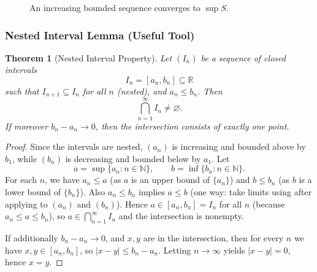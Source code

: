 \documentclass[12pt]{article}
\numberwithin{equation}{section}
\def\abs#1{|#1|}
\def\eps{epsilon}
\newcommand{\RR}{\mathbb{R}}
\newcommand{\NN}{\mathbb{N}}
\let\emptyset\varnothing
\DeclarePairedDelimiter{\abs}{\lvert}{\rvert}
\newcommand{\eps}{\varepsilon}               %
\theoremstyle{plain}
\newtheorem{theorem}{Theorem}[section]
\theoremstyle{definition}
\theoremstyle{remark}
\begin{document}
\begin{figure}[H]
\centering
{}
\caption{An increasing bounded sequence converges to $\sup S$.}
\end{figure}

\subsubsection{Nested Interval Lemma (Useful Tool)}

\begin{theorem}[Nested Interval Property]\label{thm:nested-interval}
Let $(I_n)$ be a sequence of closed intervals
\[
I_n=[a_n,b_n]\subseteq \RR
\]
such that $I_{n+1}\subseteq I_n$ for all $n$ (nested), and $a_n\le b_n$.
Then
\[
\bigcap_{n=1}^{\infty} I_n \neq \emptyset.
\]
If moreover $b_n-a_n\to 0$, then the intersection consists of exactly one point.
\end{theorem}

\begin{proof}
Since the intervals are nested, $(a_n)$ is increasing and bounded above by $b_1$, while $(b_n)$ is decreasing and bounded below by $a_1$.
Let
\[
a=\sup\{a_n:n\in\NN\}, \qquad b=\inf\{b_n:n\in\NN\}.
\]
For each $n$, we have $a_n\le a$ (as $a$ is an upper bound of $\{a_n\}$) and $b\le b_n$ (as $b$ is a lower bound of $\{b_n\}$).
Also $a_n\le b_n$ implies $a\le b$ (one way: take limits using  after applying  to $(a_n)$ and $(b_n)$).
Hence $a\in [a_n,b_n]=I_n$ for all $n$ (because $a_n\le a\le b_n$), so $a\in \bigcap_{n=1}^\infty I_n$ and the intersection is nonempty.

If additionally $b_n-a_n\to 0$, and $x,y$ are in the intersection, then for every $n$ we have $x,y\in [a_n,b_n]$, so $\abs{x-y}\le b_n-a_n$.
Letting $n\to\infty$ yields $\abs{x-y}=0$, hence $x=y$.
\end{proof}
\end{document}
